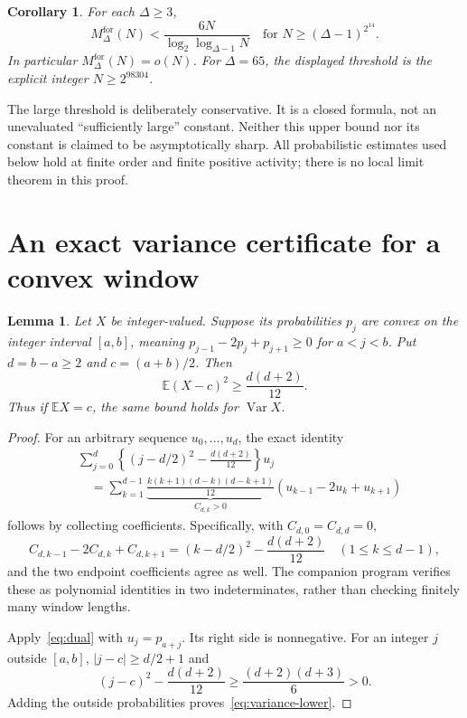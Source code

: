 \documentclass[11pt]{article}
\newtheorem{lemma}[theorem]{Lemma}
\newtheorem{corollary}[theorem]{Corollary}
\newcommand{\E}{\mathbb E}
\newcommand{\Var}{\operatorname{Var}}
\begin{document}
\begin{corollary}\label{cor:global}
For each $\Delta\ge3$,
\begin{equation}\label{eq:global}
 \boxed{M_\Delta^{\mathrm{for}}(N)
 <\frac{6N}{\log_2\log_{\Delta-1}N}
 \quad\text{for }N\ge(\Delta-1)^{2^{14}}.}
\end{equation}
In particular $M_\Delta^{\mathrm{for}}(N)=o(N)$.
For $\Delta=65$, the displayed threshold is the explicit integer
$N\ge2^{98304}$.
\end{corollary}

The large threshold is deliberately conservative. It is a closed
formula, not an unevaluated ``sufficiently large'' constant. Neither
this upper bound nor its constant is claimed to be asymptotically sharp.
All probabilistic estimates used below hold at finite order and finite
positive activity; there is no local limit theorem in this proof.

\section{An exact variance certificate for a convex window}
\begin{lemma}\label{lem:window}
Let $X$ be integer-valued. Suppose its probabilities $p_j$ are convex
on the integer interval $[a,b]$, meaning
$p_{j-1}-2p_j+p_{j+1}\ge0$ for $a<j<b$.
Put $d=b-a\ge2$ and $c=(a+b)/2$. Then
\begin{equation}\label{eq:variance-lower}
 \E(X-c)^2\ge\frac{d(d+2)}{12}.
\end{equation}
Thus if $\E X=c$, the same bound holds for $\Var X$.
\end{lemma}
\begin{proof}
For an arbitrary sequence $u_0,\ldots,u_d$, the exact identity
\begin{equation}\label{eq:dual}
 \begin{split}
 &\sum_{j=0}^{d}\left\{(j-d/2)^2-\frac{d(d+2)}{12}\right\}u_j\\
 &\quad=\sum_{k=1}^{d-1}
 \underbrace{\frac{k(k+1)(d-k)(d-k+1)}{12}}_{C_{d,k}>0}
 (u_{k-1}-2u_k+u_{k+1})
 \end{split}
\end{equation}
follows by collecting coefficients. Specifically, with $C_{d,0}=C_{d,d}=0$,
\[
 C_{d,k-1}-2C_{d,k}+C_{d,k+1}
 =(k-d/2)^2-\frac{d(d+2)}{12}
 \quad(1\le k\le d-1),
\]
and the two endpoint coefficients agree as well. The companion program
verifies these as polynomial identities in two indeterminates, rather
than checking finitely many window lengths.

Apply~\eqref{eq:dual} with $u_j=p_{a+j}$. Its right side is nonnegative.
For an integer $j$ outside $[a,b]$, $|j-c|\ge d/2+1$ and
\[
 (j-c)^2-\frac{d(d+2)}{12}
 \ge\frac{(d+2)(d+3)}6>0.
\]
Adding the outside probabilities proves~\eqref{eq:variance-lower}.
\end{proof}
\end{document}
